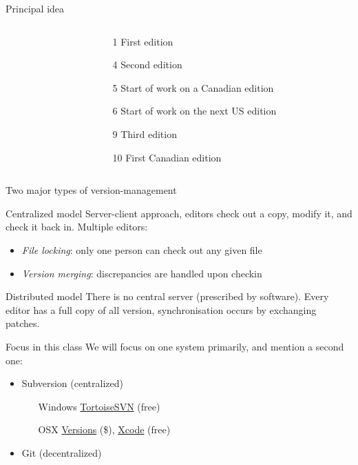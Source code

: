 \documentclass[xcolor=table,compress]{beamer}
\begin{document}
\begin{frame}{Principal idea}
\begin{columns}
\begin{column}{.48\textwidth}
\end{column}
\hfill
\begin{column}{.48\textwidth}
\begin{itemize}[<+->]
\item[1] First edition
\item[4] Second edition
\item[5] Start of work on a Canadian edition
\item[6] Start of work on the next US edition
\item[9] Third edition
\item[10] First Canadian edition
\end{itemize}
\end{column}
\end{columns}
\end{frame}

\begin{frame}{Two major types of version-management}
\begin{block}{Centralized model}
Server-client approach, editors check out a copy, modify it, and check it back in. Multiple editors:
\begin{itemize}
\item \textit{File locking}: only one person can check out any given file
\item \textit{Version merging}: discrepancies are handled upon checkin
\end{itemize}
\end{block}
\pause
\begin{block}{Distributed model}
There is no central server (prescribed by software). Every editor has a full copy of all version, synchronisation occurs by exchanging patches.
\end{block}
\end{frame}


\begin{frame}{Focus in this class}
We will focus on one system primarily, and mention a second one:
\begin{itemize}
\item Subversion (centralized)
\begin{itemize}
\item[Windows] \href{http://tortoisesvn.tigris.org/}{TortoiseSVN} (free)
\item[OSX] \href{http://versionsapp.com/}{Versions} (\$), \href{http://developer.apple.com/xcode/}{Xcode} (free)
\end{itemize}
\item Git (decentralized)
\end{itemize}
\end{frame}
\end{document}
